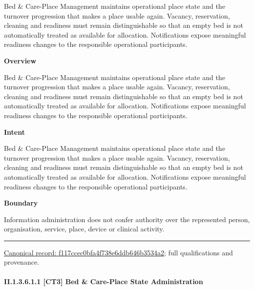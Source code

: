 Bed \& Care-Place Management maintains operational place state and the turnover progression that makes a place usable again. Vacancy, reservation, cleaning and readiness must remain distinguishable so that an empty bed is not automatically treated as available for allocation. Notifications expose meaningful readiness changes to the responsible operational participants.



\textbf{Overview}



Bed \& Care-Place Management maintains operational place state and the turnover progression that makes a place usable again. Vacancy, reservation, cleaning and readiness must remain distinguishable so that an empty bed is not automatically treated as available for allocation. Notifications expose meaningful readiness changes to the responsible operational participants.



\textbf{Intent}



Bed \& Care-Place Management maintains operational place state and the turnover progression that makes a place usable again. Vacancy, reservation, cleaning and readiness must remain distinguishable so that an empty bed is not automatically treated as available for allocation. Notifications expose meaningful readiness changes to the responsible operational participants.



\textbf{Boundary}



Information administration does not confer authority over the represented person, organisation, service, place, device or clinical activity.



\medskip\hrule\medskip

{\footnotesize \href{../../../../continuum/strategy/capability/f117ccec0bfa4f738e6ddb646b3534a2.md}{Canonical record: f117ccec0bfa4f738e6ddb646b3534a2}; full qualifications and provenance.}\par
\paragraph*{II.1.3.6.1.1 [CT3] Bed \& Care-Place State Administration}
\label{navigation:II.1.3.6.1.1}

